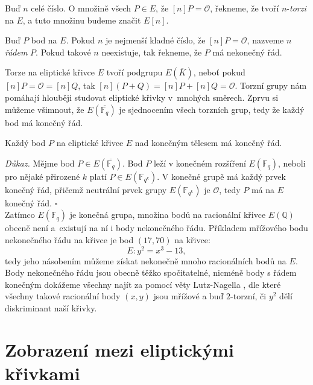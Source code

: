 \documentclass[12pt]{report}
\begin{document}
\begin{definice}
Buď $n$ celé číslo. O množině všech $P \in E$, že $[n] P = \mathcal{O}$, řekneme, že tvoří $n$-\textit{torzi} na $E$, a tuto množinu budeme značit $E[n]$.
\end{definice}

\begin{definice}
Buď $P$ bod na $E$. Pokud $n$ je nejmenší kladné číslo, že $[n]P = \mathcal{O}$, nazveme $n$ \textit{řádem} $P$. Pokud takové $n$ neexistuje, tak řekneme, že $P$ má nekonečný řád.
\end{definice}

Torze na eliptické křivce $E$ tvoří podgrupu $E(\overline{K})$, neboť pokud $[n]P = \mathcal{O} = [n]Q$, tak $[n](P+Q) =[n]P+[n]Q=\mathcal{O}$. Torzní grupy nám pomáhají hlouběji studovat eliptické křivky v~mnohých směrech. Zprvu si můžeme všimnout, že $E(\overline{\mathbb{F}_q})$ je sjednocením všech torzních grup, tedy že každý bod má konečný řád.
\begin{veta}
Každý bod $P$ na eliptické křivce $E$ nad konečným tělesem má konečný řád.
\end{veta}
\noindent \textit{Důkaz. } Mějme bod $P \in E(\overline{\mathbb{F}_q})$. Bod $P$ leží v konečném rozšíření $E\left(\mathbb{F}_q\right)$, neboli pro nějaké přirozené $k$ platí $P \in E\left(\mathbb{F}_{q^k}\right)$. V konečné grupě má každý prvek konečný řád, přičemž neutrální prvek grupy $E\left(\mathbb{F}_{q^k}\right)$ je $\mathcal{O}$, tedy $P$ má na $E$ konečný řád. \hfill $\square$\\

Zatímco $E(\mathbb{F}_q)$ je konečná grupa, množina bodů na racionální křivce $E(\mathbb{Q})$ obecně není a~existují na ní i body nekonečného řádu. Příkladem mřížového bodu nekonečného řádu na křivce je bod $(17,70)$ na křivce:
\begin{equation*}
E : y^2 = x^3 - 13,
\end{equation*}
tedy jeho násobením můžeme získat nekonečně mnoho racionálních bodů na $E$. Body nekonečného řádu jsou obecně těžko spočitatelné, nicméně body s řádem konečným dokážeme všechny najít za pomocí věty Lutz-Nagella \cite[Thm. 8.7]{Washington}, dle které všechny takové racionální body $(x,y)$ jsou mřížové a buď $2$-torzní, či $y^2$ dělí diskriminant naší křivky.

\section{Zobrazení mezi eliptickými křivkami}
\end{document}
